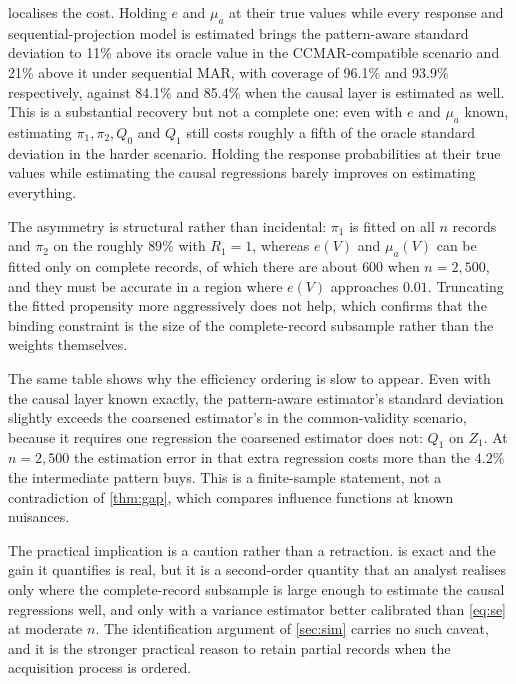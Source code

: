  localises the cost. Holding $e$ and $\mu_a$ at their
true values while every response and sequential-projection model is estimated
brings the pattern-aware standard deviation to 11\% above its
oracle value in the CCMAR-compatible scenario and 21\% above it
under sequential MAR, with coverage of
96.1\% and
93.9\% respectively, against
84.1\% and
85.4\% when the causal layer is estimated
as well. This is a substantial recovery but not a complete one: even with $e$ and
$\mu_a$ known, estimating $\pi_1,\pi_2,Q_0$ and $Q_1$ still costs roughly a fifth
of the oracle standard deviation in the harder scenario. Holding the response
probabilities at their true values while estimating the causal regressions barely
improves on estimating everything.

The asymmetry is structural rather than incidental: $\pi_1$ is fitted on all $n$
records and $\pi_2$ on the roughly $89\%$ with $R_1=1$, whereas $e(V)$ and
$\mu_a(V)$ can be fitted only on complete records, of which there are about
$600$ when $n=2{,}500$, and they must be accurate in a region where $e(V)$
approaches $0.01$. Truncating the fitted propensity more aggressively does not
help, which confirms that the binding constraint is the size of the
complete-record subsample rather than the weights themselves.

The same table shows why the efficiency ordering is slow to appear. Even with
the causal layer known exactly, the pattern-aware estimator's standard deviation
slightly exceeds the coarsened estimator's in the common-validity scenario,
because it requires one regression the coarsened estimator does not: $Q_1$ on
$Z_1$. At $n=2{,}500$ the estimation error in that extra regression costs more
than the $4.2\%$ the intermediate pattern buys. This is a finite-sample
statement, not a contradiction of \cref{thm:gap}, which compares influence
functions at known nuisances.

The practical implication is a caution rather than a retraction.
 is exact and the gain it quantifies is real, but it is a
second-order quantity that an analyst realises only where the complete-record
subsample is large enough to estimate the causal regressions well, and only with
a variance estimator better calibrated than \cref{eq:se} at moderate $n$. The
identification argument of \cref{sec:sim} carries no such caveat, and it is the
stronger practical reason to retain partial records when the acquisition process
is ordered.
